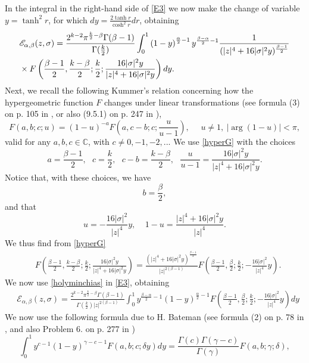 \documentclass[11pt,a4paper]{amsart}
\def \G{\Gamma}
\numberwithin{equation}{section}
\numberwithin{equation}{section}
\begin{document}
In the integral in the right-hand side of \eqref{E3} we now make the change of variable $y = \tanh^2 r$, for which $dy = \frac{2\tanh r}{\cosh^2 r} dr$, obtaining
\begin{align}\label{E3}
& \mathscr E_{\alpha,\beta}(z,\sigma) = \frac{2^{k-2} \pi^{\frac k2-\beta}\G(\beta-1)}{\G(\frac k2)} \int_0^1 \left(1-y\right)^{\frac{\alpha}2 -1} y^{\frac{\beta-\alpha}{2}-1} \frac{1}{ (|z|^4 + 16|\sigma|^2 y)^{\frac{\beta-1}2}}
\\
& \times  F\left(\frac{\beta-1}{2},\frac{k-\beta}{2};\frac k2;\frac{16|\sigma|^2 y}{|z|^4 + 16|\sigma|^2 y}\right)  dy.
\notag
\end{align}
Next, we recall the following Kummer's relation concerning how the hypergeometric function $F$ changes under linear transformations (see  formula (3) on p. 105 in \cite{E}, or also (9.5.1) on p. 247 in \cite{Le}),
\begin{equation}\label{hyperG}
F(a,b;c;u) = (1-u)^{-a} F\left(a,c - b;c;\frac{u}{u-1}\right),\ \ \ \ \ \ u\not=1, \ |\arg(1-u)|<\pi, 
\end{equation}
valid for any $a, b,c\in \mathbb C$, with $c\not= 0, - 1, - 2,...$ We use \eqref{hyperG} with the choices
\[
a = \frac{\beta-1}2,\ \ \ c = \frac k2,\ \ \ c - b = \frac{k-\beta}{2},\ \ \ \frac{u}{u-1} = \frac{16 |\sigma|^2 y}{|z|^4 + 16 |\sigma|^2 y}.
\]
Notice that, with these choices, we have 
\[
b = \frac \beta{2},
\]
and that 
\[
u = - \frac{16|\sigma|^2}{|z|^4} y,\ \ \ \ \ 1-u = \frac{|z|^4 + 16 |\sigma|^2 y}{|z|^4}.
\] 
We thus find from \eqref{hyperG}
\begin{align}\label{holyminchias}
& F\left(\frac{\beta-1}{2},\frac{k-\beta}{2};\frac k2;\frac{16|\sigma|^2 y}{|z|^4 + 16|\sigma|^2 y}\right)  
 = \frac{(|z|^4 + 16 |\sigma|^2 y)^{\frac{\beta-1}2}}{|z|^{2(\beta-1)}}  F\left(\frac{\beta-1}{2},\frac{\beta}2;\frac k2;- \frac{16|\sigma|^2}{|z|^4} y\right).
\end{align}
We now use \eqref{holyminchias} in \eqref{E3}, obtaining
\begin{align}\label{E4}
& \mathscr E_{\alpha,\beta}(z,\sigma) = \frac{2^{k-2} \pi^{\frac k2-\beta}\G(\beta-1)}{\G(\frac k2)|z|^{2(\beta-1)}} \int_0^1 y^{\frac{\beta-\alpha}{2}-1} \left(1-y\right)^{\frac{\alpha}2 -1}  F\left(\frac{\beta-1}{2},\frac{\beta}2;\frac k2;- \frac{16|\sigma|^2}{|z|^4} y\right) dy
\end{align}
We now use the following formula due to H. Bateman (see formula (2) on p. 78 in \cite{E}, and also Problem 6. on p. 277 in \cite{Le})
\begin{equation}\label{hyperGint}
\int_0^1 y^{c-1} (1-y)^{\gamma-c-1} F(a,b;c;\delta y) dy = \frac{\G(c)\G(\gamma - c)}{\G(\gamma)} F(a,b;\gamma;\delta),
\end{equation}
\end{document}
